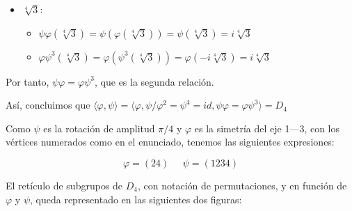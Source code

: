 \documentclass[a4paper, 11pt]{article}
\begin{document}
\begin{solucion}
\begin{apartado}
\begin{itemize}
              \item \textbf{$\sqrt[4]{3}$}:
              \begin{itemize}
                  \item $\psi\varphi(\sqrt[4]{3}) = \psi(\varphi(\sqrt[4]{3})) = \psi(\sqrt[4]{3}) = i\sqrt[4]{3}$
                  \item $\varphi\psi^3(\sqrt[4]{3}) = \varphi(\psi^3(\sqrt[4]{3})) = \varphi(-i\sqrt[4]{3}) = i\sqrt[4]{3}$
              \end{itemize}
          \end{itemize}

          Por tanto, $\psi\varphi = \varphi\psi^3$, que es la segunda relación.

          Así, concluimos que $\langle\varphi,\psi\rangle = \langle\varphi,\psi / \varphi^2 = \psi^4 = id, \psi\varphi = \varphi\psi^3\rangle = D_4$
      \end{apartado}

      \begin{apartado}
          Como $\psi$ es la rotación de amplitud $\pi/4$ y $\varphi$ es la simetría del eje 1---3, con los vértices numerados como en el enunciado, tenemos las siguientes expresiones:

          \[
          \varphi = (24) \;\;\;\;\; \psi = (1234)
          \]
      \end{apartado}

      \begin{apartado}
          El retículo de subgrupos de $D_4$, con notación de permutaciones, y en función de $\varphi$ y $\psi$, queda representado en las siguientes dos figuras:
          \vspace{1 cm}

          \centering
\end{apartado}
\end{solucion}
\end{document}

